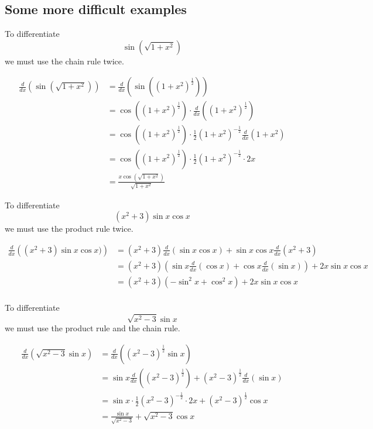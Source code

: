 \subsection{Some more difficult examples}

\begin{example}
To differentiate $$\sin\left(\sqrt{1+x^2}\right)$$ we must use the chain rule twice.

\begin{align*}
\frac{d}{dx}\left(\sin\left(\sqrt{1+x^2}\right)\right)&=\frac{d}{dx}\left(\sin\left((1+x^2)^\frac{1}{2}\right)\right)\\
&=\cos\left((1+x^2)^\frac{1}{2}\right)\cdot\frac{d}{dx}\left((1+x^2)^\frac{1}{2}\right)\\
&=\cos\left((1+x^2)^\frac{1}{2}\right)\cdot\frac{1}{2}(1+x^2)^{-\frac{1}{2}}\frac{d}{dx}\left(1+x^2\right)\\
&=\cos\left((1+x^2)^\frac{1}{2}\right)\cdot\frac{1}{2}(1+x^2)^{-\frac{1}{2}}\cdot2x\\
&=\frac{x\cos\left(\sqrt{1+x^2}\right)}{\sqrt{1+x^2}}
\end{align*}

\end{example}

\begin{example}
To differentiate $$(x^2+3)\sin x\cos x$$ we must use the product rule twice.

\begin{align*}
\frac{d}{dx}\left((x^2+3)\sin x\cos x)\right)&=(x^2+3)\frac{d}{dx}\left(\sin x\cos x\right)+\sin x\cos x\frac{d}{dx}\left(x^2+3\right)\\
&=(x^2+3)\left(\sin x\frac{d}{dx}\left(\cos x\right)+\cos x\frac{d}{dx}\left(\sin x\right)\right) + 2x\sin x\cos x\\
&=(x^2+3)\left(-\sin^2 x+\cos^2 x\right) + 2x\sin x\cos x\\
\end{align*}

\end{example}

\begin{example}
To differentiate $$\sqrt{x^2-3}\sin x$$ we must use the product rule and the chain rule.

\begin{align*}
\frac{d}{dx}\left(\sqrt{x^2-3}\sin x\right)&=\frac{d}{dx}\left((x^2-3)^\frac{1}{2}\sin x\right)\\
&=\sin x\frac{d}{dx}\left((x^2-3)^\frac{1}{2}\right)+(x^2-3)^\frac{1}{2}\frac{d}{dx}\left(\sin x\right)\\
&=\sin x\cdot\frac{1}{2}(x^2-3)^{-\frac{1}{2}}\cdot2x+(x^2-3)^\frac{1}{2}\cos x\\
&=\frac{\sin x}{\sqrt{x^2-3}}+\sqrt{x^2-3}\cos x\\
\end{align*}

\end{example}

